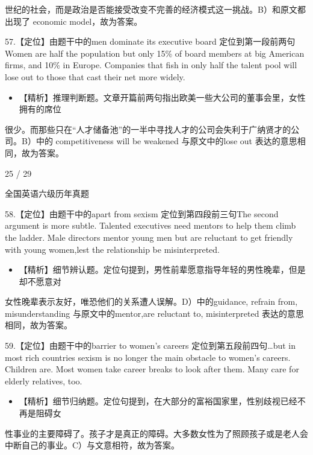 \documentclass[UTF8,11pt]{ctexart}
\begin{document}
世纪的社会，而是政治是否能接受改变不完善的经济模式这一挑战。B）和原文都出现了 economic model，故为答案。


57.【定位】由题干中的men dominate its executive board 定位到第一段前两句Women are half the population but only 15\% of board members at big American firms, and 10\% in Europe. Companies that fish in only half the talent pool will lose out to those that cast their net more widely.


\begin{itemize}[leftmargin=2em,itemsep=.2em,topsep=.4em]\item[B.] 【精析】推理判断题。文章开篇前两句指出欧美一些大公司的董事会里，女性拥有的席位
\end{itemize}

很少。而那些只在“人才储备池”的一半中寻找人才的公司会失利于广纳贤才的公司。B）中的 competitiveness will be weakened 与原文中的lose out 表达的意思相同，故为答案。


25 / 29


全国英语六级历年真题


58.【定位】由题干中的apart from sexism 定位到第四段前三句The second argument is more subtle. Talented executives need mentors to help them climb the ladder. Male directors mentor young men but are reluctant to get friendly with young women,lest the relationship be misinterpreted.


\begin{itemize}[leftmargin=2em,itemsep=.2em,topsep=.4em]\item[D.] 【精析】细节辨认题。定位句提到，男性前辈愿意指导年轻的男性晚辈，但是却不愿意对
\end{itemize}

女性晚辈表示友好，唯恐他们的关系遭人误解。D）中的guidance, refrain from, misunderstanding 与原文中的mentor,are reluctant to, misinterpreted 表达的意思相同，故为答案。


59.【定位】由题干中的barrier to women's careers 定位到第五段前四句…but in most rich countries sexism is no longer the main obstacle to women's careers. Children are. Most women take career breaks to look after them. Many care for elderly relatives, too.


\begin{itemize}[leftmargin=2em,itemsep=.2em,topsep=.4em]\item[C.] 【精析】细节归纳题。定位句提到，在大部分的富裕国家里，性别歧视已经不再是阻碍女
\end{itemize}

性事业的主要障碍了。孩子才是真正的障碍。大多数女性为了照顾孩子或是老人会中断自己的事业。C）与文意相符，故为答案。
\end{document}
